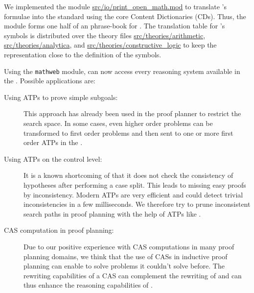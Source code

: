 \noindent  We implemented the module
\url{src/io/print_open_math.mod} to translate {\lclam}'s formulae into
the {\openmath} standard using the core {\openmath} Content
Dictionaries (CDs). Thus, the module forms one half of an {\openmath}
phrase-book for {\lclam}. The translation table for {\lclam}'s symbols
is distributed over the theory files \url{src/theories/arithmetic},
\url{src/theories/analytica}, and
\url{src/theories/constructive_logic} to keep the {\openmath}
representation close to the definition of the symbols.


Using the {\tt mathweb} module, {\lclam} can now access every
reasoning system available in the {\mathwebsb}.  Possible applications
are:
\begin{description}
\item[Using ATPs to prove simple subgoals:] This approach has already
  been used in the {\OMEGA} proof planner to restrict the search
  space. In some cases, even higher order problems can be transformed
  to first order problems and then sent to one or more first order
  ATPs in the {\mathwebsb}.
\item[Using ATPs on the control level:] It is a known shortcoming of
  {\lclam} that it does not check the consistency of hypotheses after
  performing a case split. This leads to {\lclam} missing easy proofs
  by inconsistency. Modern ATPs are very efficient and could detect
  trivial inconsistencies in a few milliseconds. We therefore try to
  prune inconsistent search paths in proof planning with the help of 
  ATPs like {\otter}.
\item[CAS computation in proof planning:] Due to our positive
  experience with CAS computations in many proof planning domains, we
  think that the use of CASs in inductive proof planning can enable
  {\lclam} to solve problems it couldn't solve before. The rewriting
  capabilities of a CAS can complement the rewriting of {\lclam} and
  can thus enhance the reasoning capabilities of {\lclam}.
\end{description}

